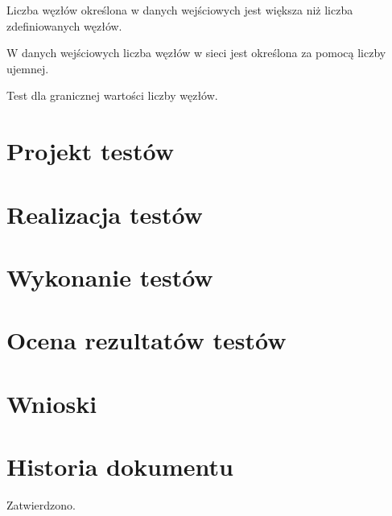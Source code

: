 \documentclass[10pt]{dokument-tiwo}
\begin{document}
Liczba węzłów określona w danych wejściowych jest większa niż liczba zdefiniowanych węzłów.

W danych wejściowych liczba węzłów w sieci jest określona za pomocą liczby ujemnej.

Test dla granicznej wartości liczby węzłów.


\section{Projekt testów}


\section{Realizacja testów}


\section{Wykonanie testów}


\section{Ocena rezultatów testów}


\section{Wnioski}


\newpage
\section*{Historia dokumentu}
\begin{versions}
        Zatwierdzono.
\end{versions}
\end{document}
